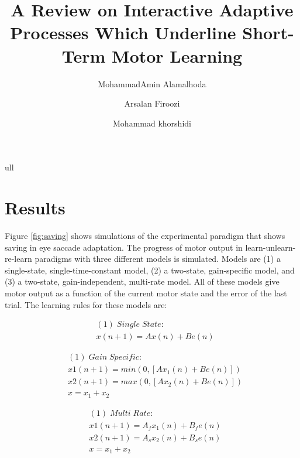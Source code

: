 \documentclass[9pt,twocolumn]{paper-template}
\title{A Review on Interactive Adaptive Processes Which Underline Short-Term Motor Learning}
\author[a]{MohammadAmin Alamalhoda}
\author[a]{Arsalan Firoozi}
\author[a]{Mohammad khorshidi}
\affil[a]{Student, EE Department, Sharif University of Technology}
\begin{document}
\maketitle
\thispagestyle{firststyle}

ull
\\
\section*{Results}


Figure \ref{fig:saving} shows simulations of the experimental paradigm that shows saving in eye saccade adaptation. The progress of motor output in learn-unlearn-re-learn paradigms with three different models is simulated. Models are (1) a single-state, single-time-constant model, (2) a two-state, gain-specific model, and (3) a two-state, gain-independent, multi-rate model. All of these models give motor output as a function of the current motor state and the error of the last trial. The learning rules for these models are:

\begin{eqnarray*}
& (1)\;Single\;State:\\
& x(n+1) = Ax(n)+Be(n)
\end{eqnarray*}

\begin{eqnarray*}
& (1)\;Gain\;Specific:\\
&x1(n+1) = min(0,[Ax_1(n)+Be(n)])\\
&x2(n+1) = max(0,[Ax_2(n)+Be(n)])\\
&x = x_1+x_2
\end{eqnarray*}


\begin{eqnarray*}
& (1)\;Multi\;Rate:\\
& x1(n+1) = A_fx_1(n) + B_fe(n)\\
& x2(n+1) = A_sx_2(n) + B_se(n)\\
&x = x_1+x_2
\end{eqnarray*}
\end{document}
